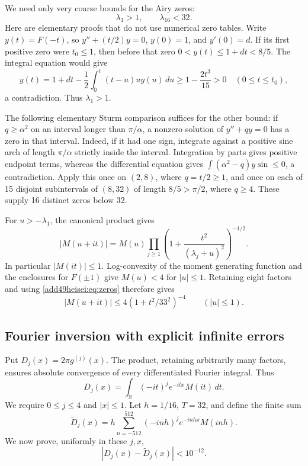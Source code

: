 \documentclass[11pt,a4paper]{article}
\numberwithin{equation}{section}
\theoremstyle{definition}
\theoremstyle{remark}
\begin{document}
We need only very coarse bounds for the Airy zeros:
\begin{equation}\label{add49heisei:eq:zeros}
 \lambda_1>1,\qquad \lambda_{16}<32.
\end{equation}
Here are elementary proofs that do not use numerical zero tables.
Write $y(t)=F(-t)$, so $y''+(t/2)y=0$, $y(0)=1$, and $y'(0)=d$.
If its first positive zero were $t_0\le1$, then before that zero
$0<y(t)\le1+dt<8/5$. The integral equation would give
\[
 y(t)=1+dt-\frac12\int_0^t(t-u)u y(u)\,du
 \ge1-\frac{2t^3}{15}>0\quad(0\le t\le t_0),
\]
a contradiction. Thus $\lambda_1>1$.

The following elementary Sturm comparison suffices for the other bound:
if $q\ge\alpha^2$ on an interval longer than $\pi/\alpha$, a nonzero
solution of $y''+qy=0$ has a zero in that interval. Indeed, if it had one
sign, integrate against a positive sine arch of length $\pi/\alpha$
strictly inside the interval. Integration by parts gives positive
endpoint terms, whereas the differential equation gives
$\int(\alpha^2-q)y\sin\le0$, a contradiction.
Apply this once on $(2,8)$, where $q=t/2\ge1$, and once on each of
15 disjoint subintervals of $(8,32)$ of length $8/5>\pi/2$, where
$q\ge4$. These supply 16 distinct zeros below 32.

For $u>-\lambda_1$, the canonical product gives
\begin{equation}\label{add49heisei:eq:modulus}
 |M(u+it)|=M(u)\prod_{j\ge1}
 \left(1+\frac{t^2}{(\lambda_j+u)^2}\right)^{-1/2}.
\end{equation}
In particular $|M(it)|\le1$. Log-convexity of the moment generating
function and the enclosures for $F(\pm1)$ give $M(u)<4$ for $|u|\le1$.
Retaining eight factors and using \eqref{add49heisei:eq:zeros} therefore gives
\begin{equation}\label{add49heisei:eq:stripdecay}
 |M(u+it)|\le4(1+t^2/33^2)^{-4}\qquad(|u|\le1).
\end{equation}

\subsection{Fourier inversion with explicit infinite errors}
Put $D_j(x)=2\pi g^{(j)}(x)$. The product, retaining arbitrarily many
factors, ensures absolute convergence of every differentiated Fourier
integral. Thus
\begin{equation}\label{add49heisei:eq:fourier}
 D_j(x)=\int_{\mathbb R}(-it)^j e^{-itx}M(it)\,dt.
\end{equation}
We require $0\le j\le4$ and $|x|\le1$. Let $h=1/16$, $T=32$, and define
the finite sum
\[
 \widetilde D_j(x)=h\sum_{n=-512}^{512}
       (-inh)^j e^{-inhx}M(inh).
\]
We now prove, uniformly in these $j,x$,
\begin{equation}\label{add49heisei:eq:fouriererror}
 |D_j(x)-\widetilde D_j(x)|<10^{-12}.
\end{equation}
\end{document}

